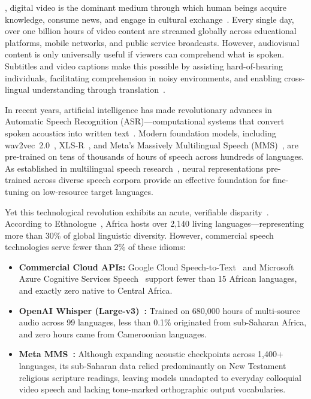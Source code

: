 \documentclass[conference]{IEEEtran}
\begin{document}
, digital video is the dominant medium through which human beings acquire knowledge, consume news, and engage in cultural exchange~\cite{norman1986user}. Every single day, over one billion hours of video content are streamed globally across educational platforms, mobile networks, and public service broadcasts. However, audiovisual content is only universally useful if viewers can comprehend what is spoken. Subtitles and video captions make this possible by assisting hard-of-hearing individuals, facilitating comprehension in noisy environments, and enabling cross-lingual understanding through translation~\cite{radford2023robust}.

In recent years, artificial intelligence has made revolutionary advances in Automatic Speech Recognition (ASR)---computational systems that convert spoken acoustics into written text~\cite{graves2006connectionist}. Modern foundation models, including wav2vec~2.0~\cite{conneau2023fleurs}, XLS-R~\cite{conneau2023fleurs}, and Meta's Massively Multilingual Speech (MMS)~\cite{conneau2023fleurs}, are pre-trained on tens of thousands of hours of speech across hundreds of languages. As established in multilingual speech research~\cite{conneau2023fleurs}, neural representations pre-trained across diverse speech corpora provide an effective foundation for fine-tuning on low-resource target languages.

Yet this technological revolution exhibits an acute, verifiable disparity~\cite{nekoto2020participatory}. According to Ethnologue~\cite{tadadjeu1979alphabet}, Africa hosts over 2,140 living languages---representing more than 30\% of global linguistic diversity. However, commercial speech technologies serve fewer than 2\% of these idioms:
\begin{itemize}
    \item \textbf{Commercial Cloud APIs:} Google Cloud Speech-to-Text~\cite{radford2023robust} and Microsoft Azure Cognitive Services Speech~\cite{radford2023robust} support fewer than 15 African languages, and exactly zero native to Central Africa.
    \item \textbf{OpenAI Whisper (Large-v3)~\cite{radford2023robust}:} Trained on 680,000 hours of multi-source audio across 99 languages, less than 0.1\% originated from sub-Saharan Africa, and zero hours came from Cameroonian languages.
    \item \textbf{Meta MMS~\cite{conneau2023fleurs}:} Although expanding acoustic checkpoints across 1,400+ languages, its sub-Saharan data relied predominantly on New Testament religious scripture readings, leaving models unadapted to everyday colloquial video speech and lacking tone-marked orthographic output vocabularies.
\end{itemize}
\end{document}
